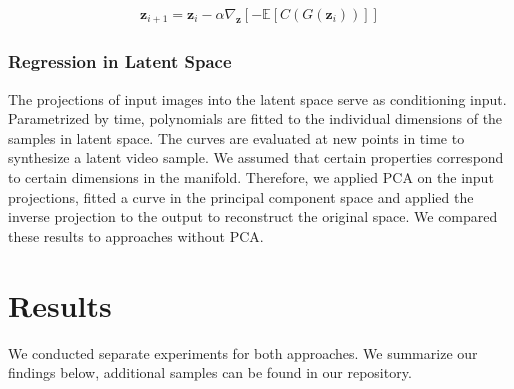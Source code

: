 \documentclass[10pt,twocolumn,letterpaper]{article}
\begin{document}
\begin{align}
\mathbf{z}_{i+1} = \mathbf{z}_{i} - \alpha \nabla_{\mathbf{z}} \left[-  \mathbb{E}[C(G(\mathbf{z}_i))] \right]
\end{align}

\subsubsection{Regression in Latent Space}
The projections of input images into the latent space serve as conditioning input. Parametrized by time, polynomials are fitted to the individual dimensions of the samples in latent space. The curves are evaluated at new points in time to synthesize a latent video sample. We assumed that certain properties correspond to certain dimensions in the manifold. Therefore, we applied PCA on the input projections, fitted a curve in the principal component space and applied the inverse projection to the output to reconstruct the original space. We compared these results to approaches without PCA.
\section{Results}
We conducted separate experiments for both approaches. We summarize our findings below, additional samples can be found in our repository. 
\end{document}
